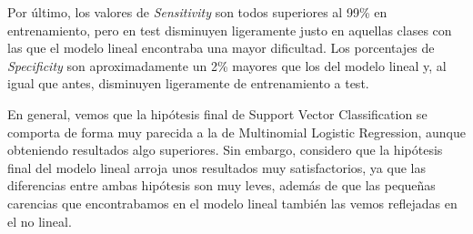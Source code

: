 \documentclass[10pt,a4paper]{article}
\begin{document}
Por último, los valores de \textit{Sensitivity} son todos superiores al 99\% en entrenamiento, pero en test disminuyen ligeramente justo en aquellas clases con las que el modelo lineal encontraba una mayor dificultad. Los porcentajes de \textit{Specificity} son aproximadamente un 2\% mayores que los del modelo lineal y, al igual que antes, disminuyen ligeramente de entrenamiento a test.

En general, vemos que la hipótesis final de Support Vector Classification se comporta de forma muy parecida a la de Multinomial Logistic Regression, aunque obteniendo resultados algo superiores. Sin embargo, considero que la hipótesis final del modelo lineal arroja unos resultados muy satisfactorios, ya que las diferencias entre ambas hipótesis son muy leves, además de que las pequeñas carencias que encontrabamos en el modelo lineal también las vemos reflejadas en el no lineal.
\end{document}
